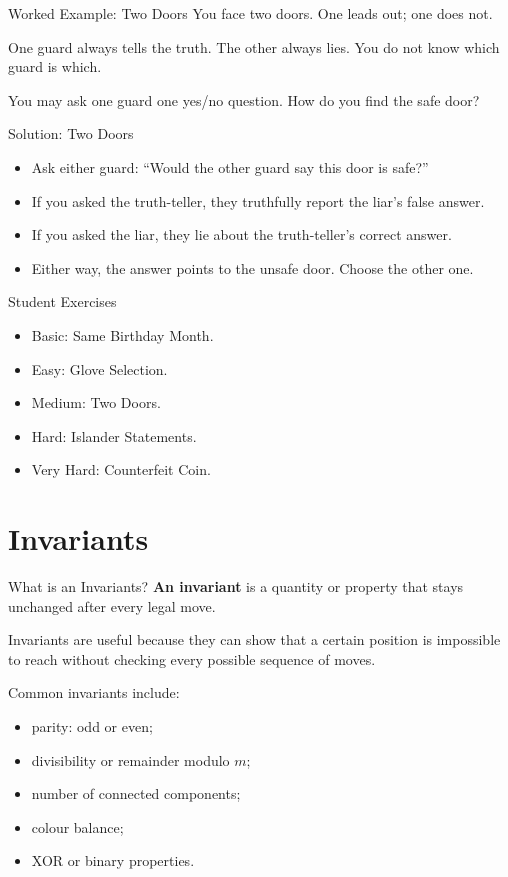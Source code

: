 \documentclass{beamer}
\begin{document}
\begin{frame}{Worked Example: Two Doors}
    You face two doors. One leads out; one does not.

    One guard always tells the truth. The other always lies. You do not
    know which guard is which.

    \vspace{0.5em}
    You may ask one guard one yes/no question. How do you find the safe door?
\end{frame}

\begin{frame}{Solution: Two Doors}
    \pause
    \begin{itemize}
        \item Ask either guard: ``Would the other guard say this door is safe?''
        \item If you asked the truth-teller, they truthfully report the
            liar's false answer.
        \item If you asked the liar, they lie about the truth-teller's
            correct answer.
        \item Either way, the answer points to the unsafe door. Choose
            the other one.
    \end{itemize}
\end{frame}

\begin{frame}{Student Exercises}
    \begin{itemize}
        \item<1-> Basic: Same Birthday Month.
        \item<1-> Easy: Glove Selection.
        \item<1-> Medium: Two Doors.
        \item<1-> Hard: Islander Statements.
        \item<1-> Very Hard: Counterfeit Coin.
    \end{itemize}
\end{frame}

\section{Invariants}

\begin{frame}{What is an Invariants?}
    \pause
    \textbf{An invariant} is a quantity or property that stays
    unchanged after every legal move.

    Invariants are useful because they can show that a certain position
    is impossible to reach without checking every possible sequence of moves.

    Common invariants include:
    \pause
    \begin{itemize}
        \item parity: odd or even;
        \item divisibility or remainder modulo $m$;
        \item number of connected components;
        \item colour balance;
        \item XOR or binary properties.
    \end{itemize}
\end{frame}
\end{document}
